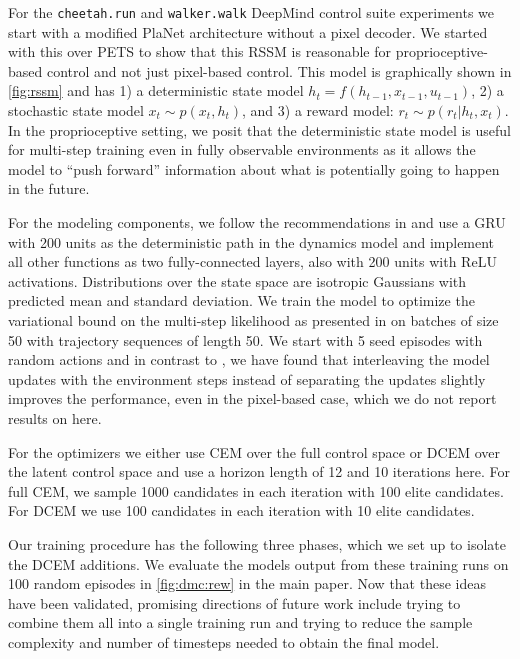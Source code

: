\documentclass{article}
\begin{document}
For the \verb!cheetah.run! and \verb!walker.walk! DeepMind control suite
experiments we start with a modified PlaNet \citep{hafner2018learning}
architecture without a pixel decoder.
We started with this over PETS \citep{chua2018deep}
to show that this RSSM is reasonable for proprioceptive-based
control and not just pixel-based control.
This model is graphically shown in \cref{fig:rssm} and has
1) a deterministic state model $h_t=f(h_{t-1}, x_{t-1}, u_{t-1})$,
2) a stochastic state model $x_t \sim p(x_t, h_t)$,
and 3) a reward model: $r_t\sim p(r_t | h_t, x_t)$.
In the proprioceptive setting, we posit that the deterministic
state model is useful for multi-step training even in
fully observable environments as it allows the model to
``push forward'' information about what is potentially
going to happen in the future.

For the modeling components, we follow the recommendations
in \citet{hafner2018learning} and use a GRU \citep{cho2014learning}
with 200 units as the deterministic path in the dynamics model and
implement all other functions as two fully-connected layers,
also with 200 units with ReLU activations.
Distributions over the state space are isotropic Gaussians
with predicted mean and standard deviation.
We train the model to optimize the variational bound on the
multi-step likelihood as presented in \citep{hafner2018learning}
on batches of size 50 with trajectory sequences of length 50.
We start with 5 seed episodes with random actions and in contrast
to \citet{hafner2018learning}, we have found that
interleaving the model updates with the environment steps
instead of separating the updates slightly improves the
performance, even in the pixel-based case, which we do not
report results on here.

For the optimizers we either use CEM over the full control space
or DCEM over the latent control space and use a horizon length
of 12 and 10 iterations here. For full CEM, we sample
1000 candidates in each iteration with 100 elite candidates.
For DCEM we use 100 candidates in each iteration with
10 elite candidates.


Our training procedure has the following three phases, which we
set up to isolate the DCEM additions.
We evaluate the models output from these training runs on 100
random episodes in \cref{fig:dmc:rew} in the main paper.
Now that these ideas
have been validated, promising directions of future work include
trying to combine them all into a single training run and
trying to reduce the sample complexity and number of timesteps
needed to obtain the final model.
\end{document}
